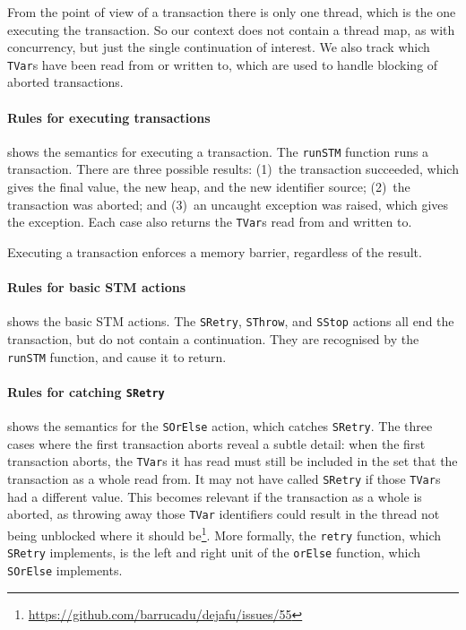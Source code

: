 From the point of view of a transaction there is only one thread,
which is the one executing the transaction.  So our context does not
contain a thread map, as with concurrency, but just the single
continuation of interest.  We also track which \verb|TVar|s have been
read from or written to, which are used to handle blocking of aborted
transactions.

\paragraph{Rules for executing transactions}
 shows the semantics for executing a transaction.
The \verb|runSTM| function runs a transaction.  There are three
possible results: (1)~the transaction succeeded, which gives the final
value, the new heap, and the new identifier source; (2)~the
transaction was aborted; and (3)~an uncaught exception was raised,
which gives the exception.  Each case also returns the \verb|TVar|s
read from and written to.

Executing a transaction enforces a memory barrier, regardless of the
result.

\paragraph{Rules for basic STM actions}
 shows the basic STM actions.  The \verb|SRetry|,
\verb|SThrow|, and \verb|SStop| actions all end the transaction, but
do not contain a continuation.  They are recognised by the
\verb|runSTM| function, and cause it to return.

\paragraph{Rules for catching \texttt{SRetry}}
 shows the semantics for the \verb|SOrElse| action,
which catches \verb|SRetry|.  The three cases where the first
transaction aborts reveal a subtle detail: when the first transaction
aborts, the \verb|TVar|s it has read must still be included in the set
that the transaction as a whole read from.  It may not have called
\verb|SRetry| if those \verb|TVar|s had a different value.  This
becomes relevant if the transaction as a whole is aborted, as throwing
away those \verb|TVar| identifiers could result in the thread not
being unblocked where it should
be\footnote{\url{https://github.com/barrucadu/dejafu/issues/55}}.
More formally, the \verb|retry| function, which \verb|SRetry|
implements, is the left and right unit of the \verb|orElse| function,
which \verb|SOrElse| implements.

